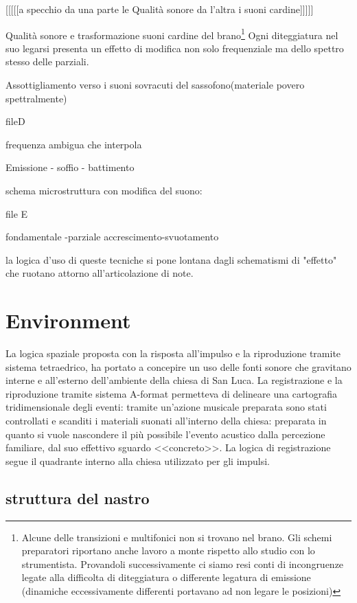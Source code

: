 [[[[[a specchio da una parte le Qualità sonore da l'altra i suoni cardine]]]]]

Qualità sonore e trasformazione suoni cardine del brano\footnote{Alcune delle transizioni
e multifonici non si trovano nel brano. Gli schemi preparatori riportano anche lavoro a
monte rispetto allo studio con lo strumentista.  Provandoli successivamente ci siamo
resi conti di incongruenze legate alla difficolta di diteggiatura o differente
legatura di emissione (dinamiche eccessivamente differenti portavano ad non legare le posizioni)}
Ogni diteggiatura nel suo legarsi presenta un effetto di modifica non solo 
frequenziale ma dello spettro stesso delle parziali.

Assottigliamento verso i suoni sovracuti del sassofono(materiale povero spettralmente)

fileD
 
frequenza ambigua che interpola

Emissione - soffio - battimento
 
 
schema microstruttura con modifica del suono:

file E

fondamentale -parziale accrescimento-svuotamento

la logica d'uso di queste tecniche si pone lontana dagli schematismi di "effetto" che ruotano attorno all'articolazione di note.                                      

\section{Environment}

La logica spaziale proposta con la risposta all'impulso e la riproduzione tramite sistema tetraedrico, ha portato a concepire un uso delle fonti sonore che gravitano interne e all’esterno dell'ambiente della chiesa di San Luca.
 La registrazione e la riproduzione tramite sistema A-format permetteva di delineare una cartografia tridimensionale degli eventi: tramite un'azione musicale preparata sono stati controllati e scanditi i materiali suonati all'interno della chiesa: preparata in quanto si vuole nascondere il più possibile l’evento acustico dalla percezione familiare, dal suo effettivo sguardo <<concreto>>.
La logica di registrazione segue il quadrante interno alla chiesa utilizzato per gli impulsi.

\subsection{struttura del nastro}

